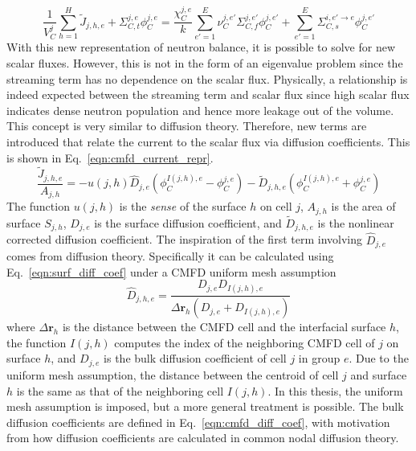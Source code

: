\begin{equation}
	\frac{1}{V_C^j} \sum_{h=1}^H \tilde{J}_{j,h,e} + \Sigma_{C,t}^{j,e} \phi_C^{j,e} = \frac{\chi_C^{j,e}}{k} \sum_{e'=1}^{E} \nu_C^{j, e'} \Sigma_{C,f}^{j,e'} \phi_C^{j,e'} + \sum_{e'=1}^E  \Sigma_{C,s}^{i, e' \rightarrow e} \phi_C^{j,e'}
	\label{eqn:transport_partial_current_1}
\end{equation}
With this new representation of neutron balance, it is possible to solve for new scalar fluxes. However, this is not in the form of an eigenvalue problem since the streaming term has no dependence on the scalar flux. Physically, a relationship is indeed expected between the streaming term and scalar flux since high scalar flux indicates dense neutron population and hence more leakage out of the volume. This concept is very similar to diffusion theory. Therefore, new terms are introduced that relate the current to the scalar flux via diffusion coefficients. This is shown in Eq.~\ref{eqn:cmfd_current_repr}.
\begin{equation}
	\frac{\tilde{J}_{j,h,e}}{A_{j,h}} = - u(j,h) \hat{D}_{j,e} \left(\phi_C^{I(j,h),e} - \phi_C^{j,e}\right) - \tilde{D}_{j,h,e} \left(\phi_C^{I(j,h),e} + \phi_C^{j,e}\right)
	\label{eqn:cmfd_current_repr}
\end{equation}
The function $u(j,h)$ is the \textit{sense} of the surface $h$ on cell $j$, $A_{j,h}$ is the area of surface $S_{j,h}$, $\hat{D}_{j,e}$ is the surface diffusion coefficient, and $\tilde{D}_{j,h,e}$ is the nonlinear corrected diffusion coefficient. The inspiration of the first term involving $\hat{D}_{j,e}$ comes from diffusion theory. Specifically it can be calculated using Eq.~\ref{eqn:surf_diff_coef} under a \ac{CMFD} uniform mesh assumption
\begin{equation}
	\hat{D}_{j,h,e} = \frac{D_{j,e} D_{I(j,h),e}}{\Delta \mathbf{r}_h \left( D_{j,e} + D_{I(j,h),e} \right)}
	\label{eqn:surf_diff_coef}
\end{equation}
where $\Delta \mathbf{r}_h$ is the distance between the \ac{CMFD} cell and the interfacial surface $h$, the function $I(j,h)$ computes the index of the neighboring \ac{CMFD} cell of $j$ on surface $h$, and $D_{j,e}$ is the bulk diffusion coefficient of cell $j$ in group $e$. Due to the uniform mesh assumption, the distance between the centroid of cell $j$ and surface $h$ is the same as that of the neighboring cell $I(j,h)$. In this thesis, the uniform mesh assumption is imposed, but a more general treatment is possible. The bulk diffusion coefficients are defined in Eq.~\ref{eqn:cmfd_diff_coef}, with motivation from how diffusion coefficients are calculated in common nodal diffusion theory.
